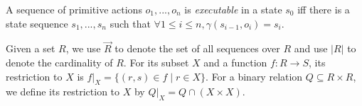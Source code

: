 \documentclass[letterpaper]{article} %
\newcommand{\Operators}{\mathcal{O}}
\newcommand{\pre}{\mathsf{pre}}
\newcommand{\add}{\mathsf{add}}
\newcommand{\del}{\mathsf{del}}
\newcommand{\closure}{\mathsf{closure}}
\begin{document}
%
A sequence of primitive actions $o_1{,}{...}{,}o_n $ is \emph{executable} in a state $s_0$ iff there is a state sequence $s_1{,}{...}{,}s_n$ such that $\forall{1 \leq i \leq n}, \gamma(s_{i-1},o_i) {=} s_i$. %

Given a set $R$, we use $\vec{R}$ to denote the set of all sequences over $R$ and use $|R|$ to denote the cardinality of $R$.
For its subset $X$ and a function $f: R \longrightarrow S$, its restriction to $X$ is
$f |_X = \{(r,s) \in f \mid r \in X\}$.
For a binary relation $Q \subseteq R \times R$, we define
its restriction to $X$ by $Q |_X = Q \cap (X \times X)$.

\end{document}
